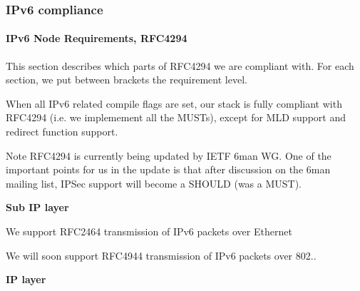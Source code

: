 \hypertarget{a00061_compliance}{}\subsubsection{\-I\-Pv6 compliance}\label{a00061_compliance}
\hypertarget{a00061_rfc4294}{}\paragraph{\-I\-Pv6 Node Requirements, R\-F\-C4294}\label{a00061_rfc4294}
\-This section describes which parts of \-R\-F\-C4294 we are compliant with. \-For each section, we put between brackets the requirement level.\par
 \-When all \-I\-Pv6 related compile flags are set, our stack is fully compliant with \-R\-F\-C4294 (i.\-e. we implemement all the \-M\-U\-S\-Ts), except for \-M\-L\-D support and redirect function support.\par
 \begin{DoxyNote}{\-Note}
\-R\-F\-C4294 is currently being updated by \-I\-E\-T\-F 6man \-W\-G. \-One of the important points for us in the update is that after discussion on the 6man mailing list, \-I\-P\-Sec support will become a \-S\-H\-O\-U\-L\-D (was a \-M\-U\-S\-T).\par

\end{DoxyNote}
{\bfseries \-Sub \-I\-P layer}\par
 \-We support \-R\-F\-C2464 transmission of \-I\-Pv6 packets over \-Ethernet\par
 \-We will soon support \-R\-F\-C4944 transmission of \-I\-Pv6 packets over 802..\par


{\bfseries \-I\-P layer}\par


